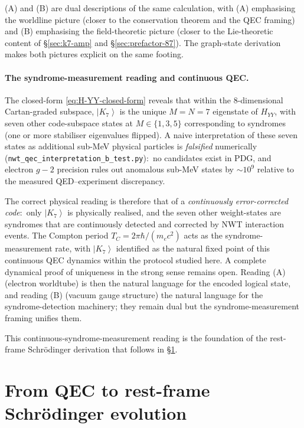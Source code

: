 \documentclass[11pt]{article}
\newcommand{\ket}[1]{\left|#1\right\rangle}
\begin{document}
(A) and (B) are dual descriptions of the same calculation, with (A)
emphasising the worldline picture (closer to the conservation
theorem and the QEC framing) and (B) emphasising the field-theoretic
picture (closer to the Lie-theoretic content of \S\ref{sec:k7-amp}
and \S\ref{sec:prefactor-87}).  The graph-state derivation makes
both pictures explicit on the same footing.

\paragraph{The syndrome-measurement reading and continuous QEC.}
The closed-form \eqref{eq:H-YY-closed-form} reveals that within the
$8$-dimensional Cartan-graded subspace, $\ket{K_7}$ is the unique
$M = N = 7$ eigenstate of $H_{YY}$, with seven other code-subspace
states at $M \in \{1, 3, 5\}$ corresponding to syndromes (one or
more stabiliser eigenvalues flipped).  A naive interpretation of
these seven states as additional sub-MeV physical particles is
\emph{falsified} numerically
(\texttt{nwt\_qec\_interpretation\_b\_test.py}):\ no candidates exist
in PDG, and electron $g{-}2$ precision rules out anomalous
sub-MeV states by $\sim 10^9$ relative to the measured QED--experiment
discrepancy.

The correct physical reading is therefore that of a
\emph{continuously error-corrected code}:\ only $\ket{K_7}$ is physically realised,
and the seven other weight-states are syndromes that are continuously
detected and corrected by NWT interaction events.  The Compton
period $T_C = 2\pi\hbar/(m_e c^2)$ acts as the syndrome-measurement
rate, with $\ket{K_7}$ identified as the natural fixed point of
this continuous QEC dynamics within the protocol studied here.
A complete dynamical proof of uniqueness in the strong sense
remains open.  Reading (A) (electron worldtube) is then the natural
language for the encoded logical state, and reading (B) (vacuum
gauge structure) the natural language for the syndrome-detection
machinery; they remain dual but the syndrome-measurement framing
unifies them.

This continuous-syndrome-measurement reading is the foundation of
the rest-frame Schr\"odinger derivation that follows in
\S\ref{sec:schrodinger}.

\section{From QEC to rest-frame Schr\"odinger evolution}
\label{sec:schrodinger}
\end{document}
